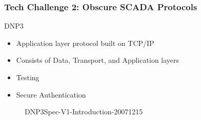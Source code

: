 \begin{frame}
\frametitle{Tech Challenge 2: Obscure SCADA Protocols}
\begin{block}{DNP3}
\begin{itemize}
\item Application layer protocol built on TCP/IP
\item Consists of Data, Transport, and Application layers
\item Testing
\item Secure Authentication
\end{itemize}
\end{block}
\begin{figure}
\caption*{DNP3Spec-V1-Introduction-20071215}
\end{figure}	
\end{frame}



